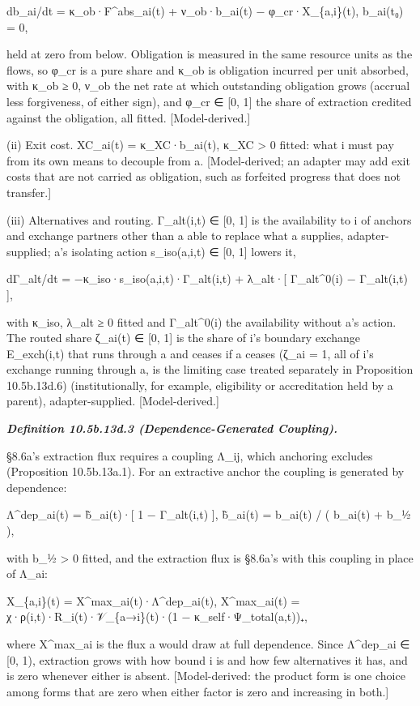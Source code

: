 \documentclass[
]{article}
\begin{document}
db\_ai/dt = κ\_ob·F\^{}abs\_ai(t) + ν\_ob·b\_ai(t) −
φ\_cr·X\_\{a,i\}(t), b\_ai(t₀) = 0,

held at zero from below. Obligation is measured in the same resource
units as the flows, so φ\_cr is a pure share and κ\_ob is obligation
incurred per unit absorbed, with κ\_ob ≥ 0, ν\_ob the net rate at which
outstanding obligation grows (accrual less forgiveness, of either sign),
and φ\_cr ∈ {[}0, 1{]} the share of extraction credited against the
obligation, all fitted. {[}Model-derived.{]}

(ii) Exit cost. XC\_ai(t) = κ\_XC·b\_ai(t), κ\_XC \textgreater{} 0
fitted: what i must pay from its own means to decouple from a.
{[}Model-derived; an adapter may add exit costs that are not carried as
obligation, such as forfeited progress that does not transfer.{]}

(iii) Alternatives and routing. Γ\_alt(i,t) ∈ {[}0, 1{]} is the
availability to i of anchors and exchange partners other than a able to
replace what a supplies, adapter-supplied; a's isolating action
s\_iso(a,i,t) ∈ {[}0, 1{]} lowers it,

dΓ\_alt/dt = −κ\_iso·s\_iso(a,i,t)·Γ\_alt(i,t) + λ\_alt·{[}
Γ\_alt\^{}0(i) − Γ\_alt(i,t) {]},

with κ\_iso, λ\_alt ≥ 0 fitted and Γ\_alt\^{}0(i) the availability
without a's action. The routed share ζ\_ai(t) ∈ {[}0, 1{]} is the share
of i's boundary exchange E\_exch(i,t) that runs through a and ceases if
a ceases (ζ\_ai = 1, all of i's exchange running through a, is the
limiting case treated separately in Proposition 10.5b.13d.6)
(institutionally, for example, eligibility or accreditation held by a
parent), adapter-supplied. {[}Model-derived.{]}

\emph{\textbf{Definition 10.5b.13d.3 (Dependence-Generated Coupling).}}

§8.6a's extraction flux requires a coupling Λ\_ij, which anchoring
excludes (Proposition 10.5b.13a.1). For an extractive anchor the
coupling is generated by dependence:

Λ\^{}dep\_ai(t) = b̃\_ai(t)·{[} 1 − Γ\_alt(i,t) {]}, b̃\_ai(t) = b\_ai(t)
/ ( b\_ai(t) + b\_½ ),

with b\_½ \textgreater{} 0 fitted, and the extraction flux is §8.6a's
with this coupling in place of Λ\_ai:

X\_\{a,i\}(t) = X\^{}max\_ai(t)·Λ\^{}dep\_ai(t), X\^{}max\_ai(t) =
χ·ρ(i,t)·R\_i(t)·𝒱\_\{a→i\}(t)·(1 − κ\_self·Ψ\_total(a,t))₊,

where X\^{}max\_ai is the flux a would draw at full dependence. Since
Λ\^{}dep\_ai ∈ {[}0, 1), extraction grows with how bound i is and how
few alternatives it has, and is zero whenever either is absent.
{[}Model-derived: the product form is one choice among forms that are
zero when either factor is zero and increasing in both.{]}
\end{document}
